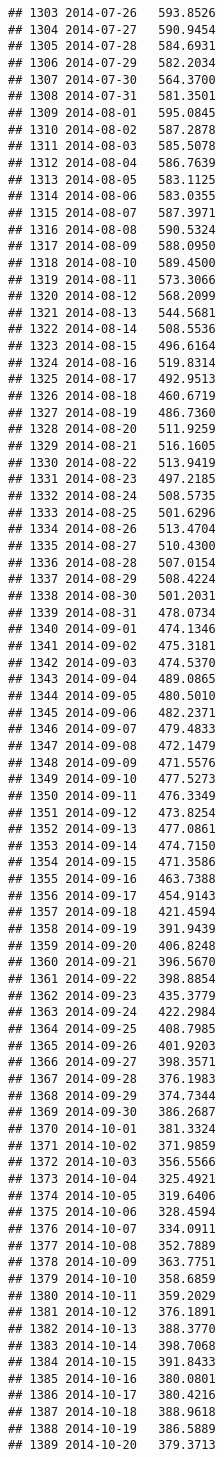 \documentclass[
]{article}
\begin{document}
\begin{verbatim}
## 1303 2014-07-26   593.8526
## 1304 2014-07-27   590.9454
## 1305 2014-07-28   584.6931
## 1306 2014-07-29   582.2034
## 1307 2014-07-30   564.3700
## 1308 2014-07-31   581.3501
## 1309 2014-08-01   595.0845
## 1310 2014-08-02   587.2878
## 1311 2014-08-03   585.5078
## 1312 2014-08-04   586.7639
## 1313 2014-08-05   583.1125
## 1314 2014-08-06   583.0355
## 1315 2014-08-07   587.3971
## 1316 2014-08-08   590.5324
## 1317 2014-08-09   588.0950
## 1318 2014-08-10   589.4500
## 1319 2014-08-11   573.3066
## 1320 2014-08-12   568.2099
## 1321 2014-08-13   544.5681
## 1322 2014-08-14   508.5536
## 1323 2014-08-15   496.6164
## 1324 2014-08-16   519.8314
## 1325 2014-08-17   492.9513
## 1326 2014-08-18   460.6719
## 1327 2014-08-19   486.7360
## 1328 2014-08-20   511.9259
## 1329 2014-08-21   516.1605
## 1330 2014-08-22   513.9419
## 1331 2014-08-23   497.2185
## 1332 2014-08-24   508.5735
## 1333 2014-08-25   501.6296
## 1334 2014-08-26   513.4704
## 1335 2014-08-27   510.4300
## 1336 2014-08-28   507.0154
## 1337 2014-08-29   508.4224
## 1338 2014-08-30   501.2031
## 1339 2014-08-31   478.0734
## 1340 2014-09-01   474.1346
## 1341 2014-09-02   475.3181
## 1342 2014-09-03   474.5370
## 1343 2014-09-04   489.0865
## 1344 2014-09-05   480.5010
## 1345 2014-09-06   482.2371
## 1346 2014-09-07   479.4833
## 1347 2014-09-08   472.1479
## 1348 2014-09-09   471.5576
## 1349 2014-09-10   477.5273
## 1350 2014-09-11   476.3349
## 1351 2014-09-12   473.8254
## 1352 2014-09-13   477.0861
## 1353 2014-09-14   474.7150
## 1354 2014-09-15   471.3586
## 1355 2014-09-16   463.7388
## 1356 2014-09-17   454.9143
## 1357 2014-09-18   421.4594
## 1358 2014-09-19   391.9439
## 1359 2014-09-20   406.8248
## 1360 2014-09-21   396.5670
## 1361 2014-09-22   398.8854
## 1362 2014-09-23   435.3779
## 1363 2014-09-24   422.2984
## 1364 2014-09-25   408.7985
## 1365 2014-09-26   401.9203
## 1366 2014-09-27   398.3571
## 1367 2014-09-28   376.1983
## 1368 2014-09-29   374.7344
## 1369 2014-09-30   386.2687
## 1370 2014-10-01   381.3324
## 1371 2014-10-02   371.9859
## 1372 2014-10-03   356.5566
## 1373 2014-10-04   325.4921
## 1374 2014-10-05   319.6406
## 1375 2014-10-06   328.4594
## 1376 2014-10-07   334.0911
## 1377 2014-10-08   352.7889
## 1378 2014-10-09   363.7751
## 1379 2014-10-10   358.6859
## 1380 2014-10-11   359.2029
## 1381 2014-10-12   376.1891
## 1382 2014-10-13   388.3770
## 1383 2014-10-14   398.7068
## 1384 2014-10-15   391.8433
## 1385 2014-10-16   380.0801
## 1386 2014-10-17   380.4216
## 1387 2014-10-18   388.9618
## 1388 2014-10-19   386.5889
## 1389 2014-10-20   379.3713

\end{verbatim}
\end{document}
